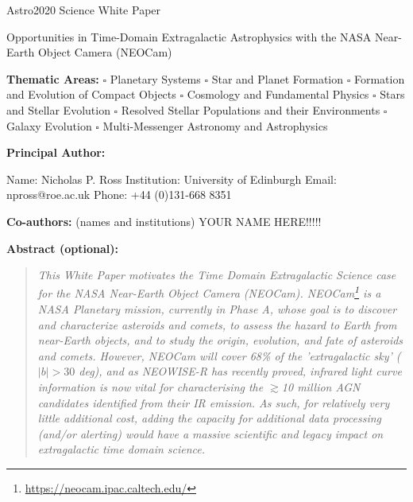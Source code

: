 \documentclass[12pt]{article}
\begin{document}
\raggedright
\huge
Astro2020 Science White Paper \linebreak

Opportunities in Time-Domain Extragalactic Astrophysics with the NASA Near-Earth Object Camera (NEOCam) \linebreak
\normalsize

\noindent \textbf{Thematic Areas:} 
\hspace*{60pt} $\square$ Planetary Systems 
\hspace*{10pt} $\square$ Star and Planet Formation 
\hspace*{20pt} 
\linebreak
$\square$ Formation and Evolution of Compact Objects 
\hspace*{31pt} $\square$ Cosmology and Fundamental Physics 
\linebreak
  $\square$  Stars and Stellar Evolution \hspace*{1pt} 
 $\square$ Resolved Stellar Populations and their Environments \hspace*{40pt} 
\linebreak
  $\square$    Galaxy Evolution   \hspace*{45pt} $\square$             
Multi-Messenger Astronomy and Astrophysics \hspace*{65pt} \linebreak
  
\textbf{Principal Author:}

Name: Nicholas P. Ross	
 \linebreak						
Institution:  University of Edinburgh
 \linebreak
Email: npross@roe.ac.uk
 \linebreak
Phone:  +44 (0)131-668 8351
 \linebreak
 
\textbf{Co-authors:} (names and institutions)
  \linebreak
YOUR NAME HERE!!!!!

\textbf{Abstract  (optional):}


\pagebreak

\begin{quotation}
\noindent
{\it 
This White Paper motivates the {\it Time Domain Extragalactic Science case} for 
the NASA Near-Earth Object Camera (NEOCam). 
NEOCam\footnote{\href{https://neocam.ipac.caltech.edu/}{https://neocam.ipac.caltech.edu/}} is a NASA Planetary mission, currently in Phase A, whose goal is to discover and characterize asteroids and comets, to assess the hazard to Earth from near-Earth objects, and to study the origin, evolution, and fate of asteroids and comets.
However, NEOCam will cover 68\% of the 'extragalactic sky' ($|b| > 30$ deg), 
and as NEOWISE-R has recently proved, infrared light curve information is now vital for characterising the $\gtrsim$10 million AGN candidates identified from their IR emission. 
As such, for relatively very little additional cost, adding the capacity for additional data processing (and/or alerting) would have a massive scientific and legacy impact on extragalactic time domain science. 
}
\noindent
\end{quotation}
\end{document}
